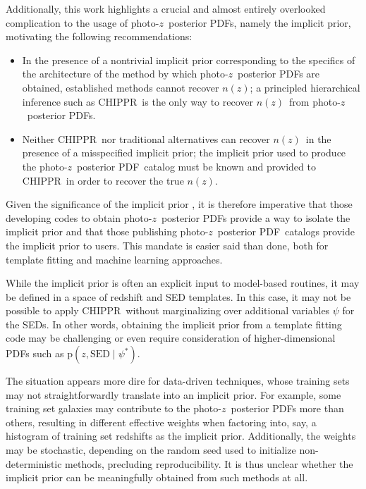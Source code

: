 \documentclass[iop]{emulateapj}
\newcommand{\todo}[3]{{\color{#2}\emph{#1}: #3}}
\newcommand{\aim}[1]{\todo{AIM}{red}{#1}}
\newcommand{\project}[1]{\textsc{#1}}
\newcommand{\Chippr}{\project{CHIPPR}}%
\newcommand{\pr}[1]{\ensuremath{\mathrm{p}(#1)}}%
\newcommand{\gvn}{\mid}%
\newcommand{\pz}{photo-$z$}
\newcommand{\pzpdf}{\pz\ posterior PDF}%
\newcommand{\nz}{$n(z)$}
\begin{document}
Additionally, this work highlights a crucial and almost entirely overlooked complication to the usage of \pzpdf s, namely the implicit prior, motivating the following recommendations: 
\begin{itemize}
\item In the presence of a nontrivial implicit prior corresponding to the specifics of the architecture of the method by which \pzpdf s are obtained, established methods cannot recover \nz;
a principled hierarchical inference such as \Chippr\ is the only way to recover \nz\ from \pzpdf s.
\item %
Neither \Chippr\ nor traditional alternatives can recover \nz\ in the presence of a misspecified implicit prior;
the implicit prior used to produce the \pzpdf\ catalog must be known and provided to \Chippr\ in order to recover the true \nz.
\end{itemize}
Given the significance of the implicit prior \citep{schmidt_evaluation_2020}, it is therefore imperative that those developing codes to obtain \pzpdf s provide a way to isolate the implicit prior and that those publishing \pzpdf\ catalogs provide the implicit prior to users.
This mandate is easier said than done, both for template fitting and machine learning approaches.

While the implicit prior is often an explicit input to model-based routines, it may be defined in a space of redshift and SED templates.
In this case, it may not be possible to apply \Chippr\ without marginalizing over additional variables $\psi$ for the SEDs.
In other words, obtaining the implicit prior from a template fitting code may be challenging or even require consideration of higher-dimensional PDFs such as $\pr{z, \mathrm{SED} \gvn \psi^{*}}$.

The situation appears more dire for data-driven techniques, whose training sets may not straightforwardly translate into an implicit prior.
For example, some training set galaxies may contribute to the \pzpdf s more than others, resulting in different effective weights when factoring into, say, a histogram of training set redshifts as the implicit prior.
Additionally, the weights may be stochastic, depending on the random seed used to initialize non-deterministic methods, precluding reproducibility.
It is thus unclear whether the implicit prior can be meaningfully obtained from such methods at all.

\end{document}
